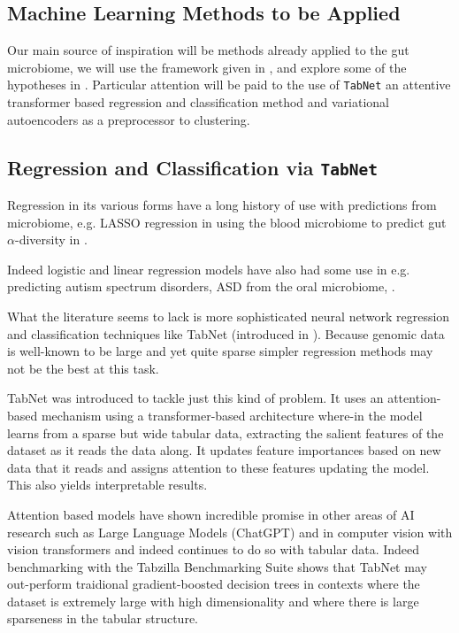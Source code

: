 \documentclass{article}
\begin{document}
\begin{multicols}{2}
\section{Machine Learning Methods to be Applied} 
Our main source of inspiration will be methods already applied to the gut microbiome, we will use the framework given in \cite{li_machine_2022}, and explore some of the hypotheses in \cite{tao_relationship_2024}. Particular attention will be paid to the use of \texttt{TabNet} an attentive transformer based regression and classification method and variational autoencoders as a preprocessor to clustering.
\subsection{Regression and Classification via \texttt{TabNet}}
Regression in its various forms have a long history of use with predictions from microbiome, e.g. LASSO regression in using the blood microbiome to predict gut $\alpha$-diversity in \cite{wilmanski_blood_2019}. 

Indeed logistic and linear regression models have also had some use in e.g. predicting autism spectrum disorders, ASD from the oral microbiome, \cite{li_genetic_2022}. 

What the literature seems to lack is more sophisticated neural network regression and classification techniques like TabNet (introduced in \cite{arik_tabnet_2021}). Because genomic data is well-known to be large and yet quite sparse simpler regression methods may not be the best at this task. 

TabNet was introduced to tackle just this kind of problem. It uses an attention-based mechanism using a transformer-based \cite{vaswani_attention_2017} architecture where-in the model learns from a sparse but wide tabular data, extracting the salient features of the dataset as it reads the data along. It updates feature importances based on new data that it reads and assigns attention to these features updating the model. This also yields interpretable results.

Attention based models have shown incredible promise in other areas of AI research such as Large Language Models (ChatGPT) and in computer vision with vision transformers and indeed continues to do so with tabular data. Indeed benchmarking with the Tabzilla Benchmarking Suite \cite{mcelfresh2023neural} shows that TabNet may out-perform traidional gradient-boosted decision trees in contexts where the dataset is extremely large with high dimensionality and where there is large sparseness in the tabular structure.


\end{multicols}
\end{document}
